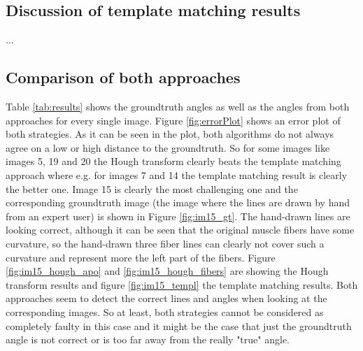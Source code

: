 \documentclass[10pt,twocolumn,letterpaper]{article}
\begin{document}
\subsection{Discussion of template matching results}

...

\subsection{Comparison of both approaches}

Table \ref{tab:results} shows the groundtruth angles as well as the angles from both approaches for every single image.
Figure \ref{fig:errorPlot} shows an error plot of both strategies. As it can be seen in the plot, both algorithms do not always agree on a low or high distance to the groundtruth. So for some images like images 5, 19 and 20 the Hough transform clearly beats the template matching approach where e.g. for images 7 and 14 the template matching result is clearly the better one.
Image 15 is clearly the most challenging one and the corresponding groundtruth image (the image where the lines are drawn by hand from an expert user) is shown in Figure \ref{fig:im15_gt}. 
The hand-drawn lines are looking correct, although it can be seen that the original muscle fibers have some curvature, so the hand-drawn three fiber lines can clearly not cover such a curvature and represent more the left part of the fibers.
Figure \ref{fig:im15_hough_apo} and \ref{fig:im15_hough_fibers} are showing the Hough transform results and figure \ref{fig:im15_templ} the template matching results.
Both approaches seem to detect the correct lines and angles when looking at the corresponding images. So at least, both strategies cannot be considered as completely faulty in this case and it might be the case that just the groundtruth angle is not correct or is too far away from the really "true" angle.
\end{document}
